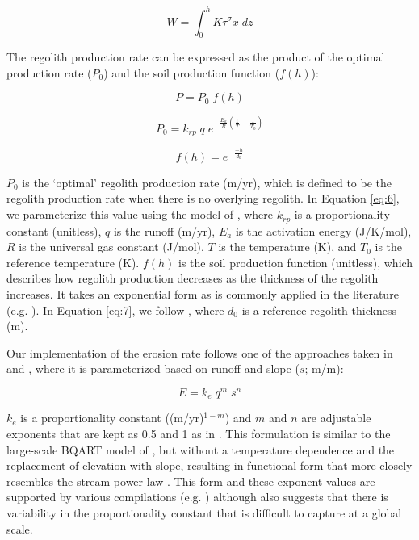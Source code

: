 \documentclass[11pt,letterpaper]{article}
\begin{document}
\begin{equation}
    W = \int_{0}^{h} K \tau^{\sigma} x\;dz
    \label{eq:4}
\end{equation}

The regolith production rate can be expressed as the product of the optimal production rate ($P_{0}$) and the soil production function ($f(h)$):

\begin{equation}
    P = P_{0}\;f(h)
    \label{eq:5}
\end{equation}

\begin{equation}
    P_{0} = k_{rp}\;q\;e^{-\frac{E_{a}}{R}\left(\frac{1}{T}-\frac{1}{T_{0}}\right)}
    \label{eq:6}
\end{equation}

\begin{equation}
    f(h) = e^{-\frac{-h}{d_{0}}}
    \label{eq:7}
\end{equation}

\noindent
$P_{0}$ is the `optimal' regolith production rate (m/yr), which is defined to be the regolith production rate when there is no overlying regolith. In Equation \ref{eq:6}, we parameterize this value using the model of \citet{Carretier2014a}, where $k_{rp}$ is a proportionality constant (unitless), $q$ is the runoff (m/yr), $E_{a}$ is the activation energy (J/K/mol), $R$ is the universal gas constant (J/mol), $T$ is the temperature (K), and $T_{0}$ is the reference temperature (K). $f(h)$ is the soil production function (unitless), which describes how regolith production decreases as the thickness of the regolith increases. It takes an exponential form as is commonly applied in the literature (e.g. \citealp{Gabet2009a}). In Equation \ref{eq:7}, we follow \citet{Heimsath1997a}, where $d_{0}$ is a reference regolith thickness (m).

Our implementation of the erosion rate follows one of the approaches taken in \citet{Godderis2017c} and \citet{Maffre2018a}, where it is parameterized based on runoff and slope ($s$; m/m):

\begin{equation}
    E = k_{e}\;q^{m}\;s^{n}
    \label{eq:8}
\end{equation}

\noindent
$k_{e}$ is a proportionality constant ((m/yr)$^{1-m}$) and $m$ and $n$ are adjustable exponents that are kept as 0.5 and 1 as in \citet{Maffre2018a}. This formulation is similar to the large-scale BQART model of \citet{Syvitski2007a}, but without a temperature dependence and the replacement of elevation with slope, resulting in functional form that more closely resembles the stream power law \citep{Davy2000a}. This form and these exponent values are supported by various compilations (e.g. \citealp{Lague2014a}) although \citet{Lague2014a} also suggests that there is variability in the proportionality constant that is difficult to capture at a global scale.
\end{document}
